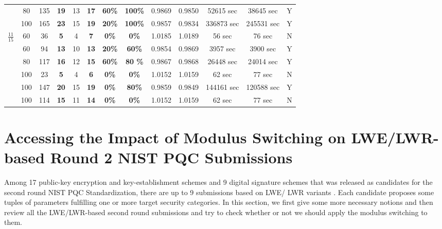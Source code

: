 \documentclass{cta-author}
\begin{document}
\begin{table}[t]
\begin{tabular}{| c|| c| c | c | c | c || c | c |c|c| c|c|c| }
		&80&135&\textbf{19}&13&\textbf{17}&\textbf{60\%}&\textbf{100\%}&0.9869&0.9850&52615 sec&38645 sec&Y\\
		
		&100&165&\textbf{23}&15&\textbf{19}&\textbf{20\%}&\textbf{100\%}&0.9857&0.9834&336873 sec&245531 sec&Y\\
		
		
		\hline
		
		\multirow{6}{*}{$\frac{11}{15}$}&60&36&\textbf{5}&4&\textbf{7}&\textbf{0\%}&\textbf{0\%}&1.0185&1.0189&56 sec&76 sec&N\\
		&60&94&\textbf{13}&10&\textbf{13}&\textbf{20\%}&\textbf{60\%}&0.9854&0.9869&3957 sec&3900 sec&Y\\
		
		
		&80&117&\textbf{16}&12&\textbf{15}&\textbf{60\%}&\textbf{80 \%}&0.9867&0.9868& 26448 sec& 24014 sec&Y\\
		
		
		&100&23&\textbf{5}&4&\textbf{6}&\textbf{0\%}&\textbf{0\%}&1.0152&1.0159&62 sec&77 sec&N\\
		&100&147&\textbf{20}&15&\textbf{19}&\textbf{0\%}&\textbf{80\%}&0.9859&0.9849&144161 sec&120588 sec&Y\\
		
		
		&	100&114&\textbf{15}&11&\textbf{14}&\textbf{0\%}&\textbf{0\%}&1.0152&1.0159&62 sec&77 sec&N\\
		
		
		\hline
		
		
		
	\end{tabular}
	\label{table:6}
\end{table}




\section{Accessing the Impact of Modulus Switching on LWE/LWR-based Round 2 NIST PQC Submissions} \label{sec8}
Among 17 public-key encryption and key-establishment schemes and 9 digital signature schemes that was released as candidates for the second round NIST PQC Standardization, there are up to 9 submissions based on LWE/ LWR variants \cite{AAA+19}. Each candidate proposes some tuples of parameters fulfilling one or more target security categories. In this section, we first give some more necessary notions and then review all the LWE/LWR-based second round submissions and try to check whether or not we should apply the modulus switching to them.
\end{document}
